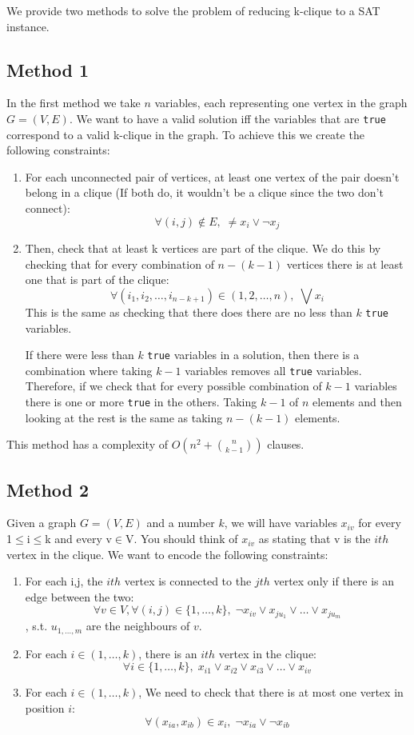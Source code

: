 \documentclass[table]{article}
\begin{document}
We provide two methods to solve the problem of reducing k-clique to a SAT instance.
\subsection{Method 1}\label{s1}
In the first method we take $n$ variables, each representing one vertex in the graph $G = (V,E)$. We want to have a valid solution iff the variables that are \lstinline{true} correspond to a valid k-clique in the graph.
To achieve this we create the following constraints:

\begin{enumerate}
    \item For each unconnected pair of vertices, at least one vertex of the pair doesn't belong in a clique (If both do, it wouldn't be a clique since the two don't connect):
    \[ \forall (i, j) \notin E, \; \neq x_i \lor \neg x_j \]
    \item Then, check that at least k vertices are part of the clique. We do this by checking that for every combination of $n-(k-1)$ vertices there is at least one that is part of the clique:
    \[ \forall (i_1, i_2, \dots, i_{n-k+1}) \in (1, 2, \dots, n), \; \bigvee x_i \]
    This is the same as checking that there does there are no less than $k$ \lstinline{true} variables. 
    
    If there were less than $k$ \lstinline{true} variables in a solution, then there is a combination where taking $k-1$ variables removes all \lstinline{true} variables. 
    Therefore, if we check that for every possible combination of $k-1$ variables there is one or more \lstinline{true} in the others. Taking $k-1$ of $n$ elements and then looking at the rest is the same as taking $n-(k-1)$ elements.
    \end{enumerate}
This method has a complexity of $O\left(n^2+{{n}\choose{k-1}}\right)$ clauses.
\subsection{Method 2}    
Given a graph $G = (V,E)$ and a number $k$, we will have variables $x_{iv}$ for every 1$\leq$i$\leq$k and every v$\in$V. You should think of $x_{iv}$ as stating that v is the $ith$ vertex in the clique. We want to encode the following constraints:

\begin{enumerate}
\item 	For each i,j, the $ith$ vertex is connected to the $jth$ vertex only if there is an edge between the two: \[\forall v\in V, \forall(i,j)\in \{1,\dots,k\}, \; \neg x_{iv} \lor x_{ju_1} \lor \dots \lor x_{ju_m}\], s.t. $u_{1,\dots,m}$ are the neighbours of $v$.
\item 	For each $i\in(1,\dots,k)$, there is an $ith$ vertex in the clique: \[\forall i\in \{1,\dots,k\}, \; x_{i1} \lor x_{i2} \lor x_{i3} \lor \dots \lor x_{iv}\]
\item   For each $i\in(1,\dots,k)$, We need to check that there is at most one vertex in position $i$: \[\forall(x_{ia},x_{ib})\in x_i, \; \neg x_{ia} \lor \neg x_{ib}\]
\end{enumerate}
\end{document}
